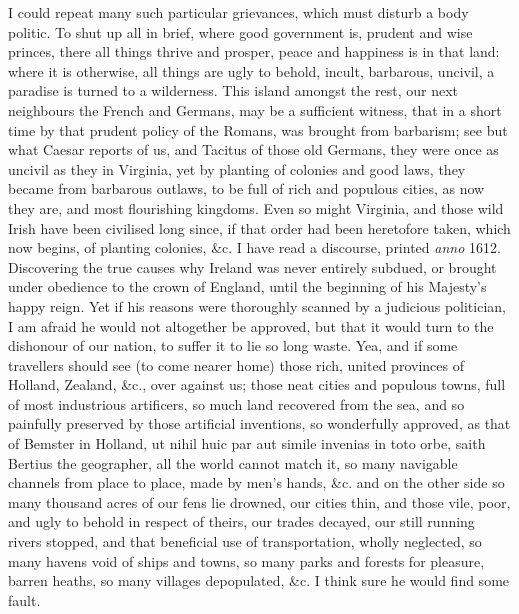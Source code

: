 {I could repeat many such particular grievances, which must disturb a
body politic. To shut up all in brief, where good government is,
prudent and wise princes, there all things thrive and prosper, peace
and happiness is in that land: where it is otherwise, all things are
ugly to behold, incult, barbarous, uncivil, a paradise is turned to a
wilderness. This island amongst the rest, our next neighbours the
French and Germans, may be a sufficient witness, that in a short time
by that prudent policy of the Romans, was brought from barbarism; see
but what Caesar reports of us, and Tacitus of those old Germans, they
were once as uncivil as they in Virginia, yet by planting of colonies
and good laws, they became from barbarous outlaws, to be full of
rich and populous cities, as now they are, and most flourishing
kingdoms. Even so might Virginia, and those wild Irish have been
civilised long since, if that order had been heretofore taken, which
now begins, of planting colonies, \&c. I have read a discourse,
printed \emph{anno} 1612. Discovering the true causes why Ireland was never
entirely subdued, or brought under obedience to the crown of England,
until the beginning of his Majesty's happy reign. Yet if his reasons
were thoroughly scanned by a judicious politician, I am afraid he would
not altogether be approved, but that it would turn to the dishonour of
our nation, to suffer it to lie so long waste. Yea, and if some
travellers should see (to come nearer home) those rich, united
provinces of Holland, Zealand, \&c., over against us; those neat cities
and populous towns, full of most industrious artificers, so much
land recovered from the sea, and so painfully preserved by those
artificial inventions, so wonderfully approved, as that of Bemster in
Holland, ut nihil huic par aut simile invenias in toto orbe, saith
Bertius the geographer, all the world cannot match it, so many
navigable channels from place to place, made by men's hands, \&c. and on
the other side so many thousand acres of our fens lie drowned, our
cities thin, and those vile, poor, and ugly to behold in respect of
theirs, our trades decayed, our still running rivers stopped, and that
beneficial use of transportation, wholly neglected, so many havens void
of ships and towns, so many parks and forests for pleasure, barren
heaths, so many villages depopulated, \&c. I think sure he would find
some fault.

}
